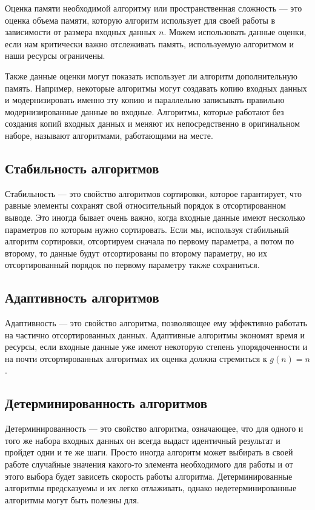 \documentclass[a4paper,12pt]{article}
\begin{document}
Оценка памяти необходимой алгоритму или пространственная сложность --- это оценка объема памяти, которую алгоритм использует для своей работы в зависимости от размера входных данных $n$. Можем использовать данные оценки, если нам критически важно отслеживать память, используемую алгоритмом и наши ресурсы ограничены.

Также данные оценки могут показать использует ли алгоритм дополнительную память. Например, некоторые алгоритмы могут создавать копию входных данных и модернизировать именно эту копию и параллельно записывать правильно модернизированные данные во входные. Алгоритмы, которые работают без создания копий входных данных и меняют их непосредственно в оригинальном наборе, называют алгоритмами, работающими на месте.

\subsection{Стабильность алгоритмов}
\label{subsec:стабильность-алгоритмов}

Стабильность --- это свойство алгоритмов сортировки, которое гарантирует, что равные элементы сохранят свой относительный порядок в отсортированном выводе. Это иногда бывает очень важно, когда входные данные имеют несколько параметров по которым нужно сортировать. Если мы, используя стабильный алгоритм сортировки, отсортируем сначала по первому параметра, а потом по второму, то данные будут отсортированы по второму параметру, но их отсортированный порядок по первому параметру также сохраниться.

\subsection{Адаптивность алгоритмов}
\label{subsec:адаптивность-алгоритмов}

Адаптивность --- это свойство алгоритма, позволяющее ему эффективно работать на частично отсортированных данных. Адаптивные алгоритмы экономят время и ресурсы, если входные данные уже имеют некоторую степень упорядоченности и на почти отсортированных алгоритмах их оценка должна стремиться к $g(n) = n$.

\subsection{Детерминированность алгоритмов}
\label{subsec:детерминированность-алгоритмов}

Детерминированность --- это свойство алгоритма, означающее, что для одного и того же набора входных данных он всегда выдаст идентичный результат и пройдет одни и те же шаги. Просто иногда алгоритм может выбирать в своей работе случайные значения какого-то элемента необходимого для работы и от этого выбора будет зависеть скорость работы алгоритма. Детерминированные алгоритмы предсказуемы и их легко отлаживать, однако недетерминированные алгоритмы могут быть полезны для.
\end{document}
